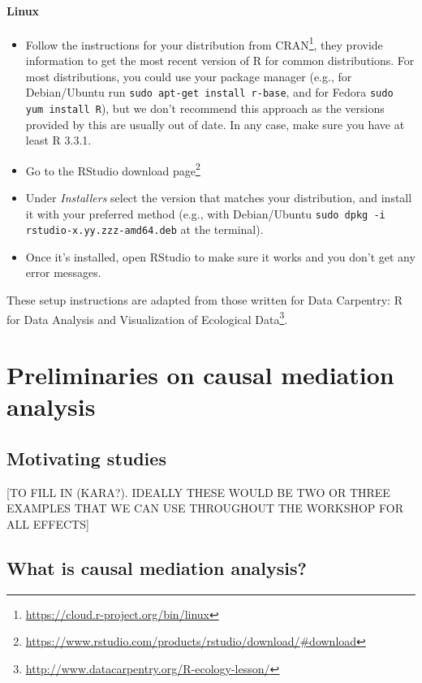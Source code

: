 \documentclass[
  12pt,
]{book}
\newcommand{\passthrough}[1]{#1}
\providecommand{\tightlist}{%
  \setlength{\itemsep}{0pt}\setlength{\parskip}{0pt}}
\renewcommand{\href}[2]{#2\footnote{\url{#1}}}
\theoremstyle{definition}
\theoremstyle{definition}
\theoremstyle{definition}
\newcommand{\1}{\mathbbm{1}}
\begin{document}
\hypertarget{linux}{%
\subsubsection{Linux}\label{linux}}

\begin{itemize}
\tightlist
\item
  Follow the instructions for your distribution
  from \href{https://cloud.r-project.org/bin/linux}{CRAN}, they provide information
  to get the most recent version of R for common distributions. For most
  distributions, you could use your package manager (e.g., for Debian/Ubuntu run
  \passthrough{\lstinline!sudo apt-get install r-base!}, and for Fedora \passthrough{\lstinline!sudo yum install R!}), but we
  don't recommend this approach as the versions provided by this are
  usually out of date. In any case, make sure you have at least R 3.3.1.
\item
  Go to the \href{https://www.rstudio.com/products/rstudio/download/\#download}{RStudio download
  page}
\item
  Under \emph{Installers} select the version that matches your distribution, and
  install it with your preferred method (e.g., with Debian/Ubuntu \passthrough{\lstinline!sudo dpkg -i rstudio-x.yy.zzz-amd64.deb!} at the terminal).
\item
  Once it's installed, open RStudio to make sure it works and you don't get any
  error messages.
\end{itemize}

These setup instructions are adapted from those written for \href{http://www.datacarpentry.org/R-ecology-lesson/}{Data Carpentry: R
for Data Analysis and Visualization of Ecological
Data}.

\hypertarget{mediation}{%
\chapter{Preliminaries on causal mediation analysis}\label{mediation}}

\hypertarget{motivating-studies}{%
\section{Motivating studies}\label{motivating-studies}}

{[}TO FILL IN (KARA?). IDEALLY THESE WOULD BE TWO OR THREE EXAMPLES THAT WE CAN
USE THROUGHOUT THE WORKSHOP FOR ALL EFFECTS{]}

\hypertarget{what-is-causal-mediation-analysis}{%
\section{What is causal mediation analysis?}\label{what-is-causal-mediation-analysis}}
\end{document}
